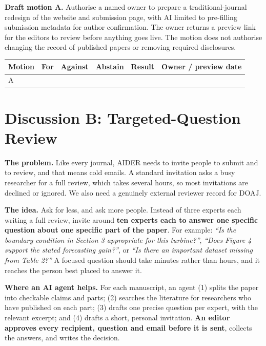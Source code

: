 \documentclass[11pt]{article}
\begin{document}
\begin{solvebox}
\textbf{Draft motion A.} Authorise a named owner to prepare a traditional-journal redesign of the website and submission page, with AI limited to pre-filling submission metadata for author confirmation. The owner returns a preview link for the editors to review before anything goes live. The motion does not authorise changing the record of published papers or removing required disclosures.
\end{solvebox}

\begin{center}\small\sffamily
\begin{tabular}{@{}p{1.6cm}p{1.8cm}p{1.8cm}p{1.8cm}p{2cm}p{4cm}@{}}
\toprule
\textbf{Motion} & \textbf{For} & \textbf{Against} & \textbf{Abstain} & \textbf{Result} & \textbf{Owner / preview date} \\
\midrule
A & & & & & \\[9pt]
\bottomrule
\end{tabular}
\end{center}

\section{Discussion B: Targeted-Question Review}

\textbf{The problem.} Like every journal, AIDER needs to invite people to submit and to review, and that means cold emails. A standard invitation asks a busy researcher for a full review, which takes several hours, so most invitations are declined or ignored. We also need a genuinely external reviewer record for DOAJ.

\textbf{The idea.} Ask for less, and ask more people. Instead of three experts each writing a full review, invite around \textbf{ten experts each to answer one specific question about one specific part of the paper}. For example: \emph{``Is the boundary condition in Section 3 appropriate for this turbine?''}, \emph{``Does Figure 4 support the stated forecasting gain?''}, or \emph{``Is there an important dataset missing from Table 2?''} A focused question should take minutes rather than hours, and it reaches the person best placed to answer it.

\begin{takeaway}
\textbf{Where an AI agent helps.} For each manuscript, an agent (1) splits the paper into checkable claims and parts; (2) searches the literature for researchers who have published on each part; (3) drafts one precise question per expert, with the relevant excerpt; and (4) drafts a short, personal invitation. \textbf{An editor approves every recipient, question and email before it is sent}, collects the answers, and writes the decision.
\end{takeaway}
\end{document}

